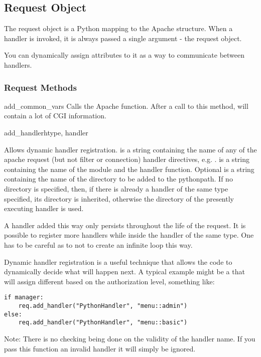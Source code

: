 \subsection{Request Object\label{pyapi-mprequest}}

The request object is a Python mapping to the Apache
 structure. When a handler is invoked, it is always
passed a single argument - the request object. 

You can dynamically assign attributes to it as a way to communicate
between handlers.

\subsubsection{Request Methods\label{pyapi-mprequest-meth}}

\begin{methoddesc}[request]{add_common_vars}{}
Calls the Apache  function. After a
call to this method,  will contain a
lot of CGI information.
\end{methoddesc}

\begin{methoddesc}[request]{add_handler}{htype, handler}

Allows dynamic handler registration.  is a string
containing the name of any of the apache request (but not filter or
connection) handler directives,
e.g. .  is a string containing the
name of the module and the handler function.  Optional  is a
string containing the name of the directory to be added to the
pythonpath. If no directory is specified, then, if there is already a
handler of the same type specified, its directory is inherited,
otherwise the directory of the presently executing handler is used.
                  
A handler added this way only persists throughout the life of the
request. It is possible to register more handlers while inside the
handler of the same type. One has to be careful as to not to create an
infinite loop this way.

Dynamic handler registration is a useful technique that allows the
code to dynamically decide what will happen next. A typical example
might be a  that will assign different
 based on the authorization level, something like:

\begin{verbatim}
if manager:
    req.add_handler("PythonHandler", "menu::admin")
else:
    req.add_handler("PythonHandler", "menu::basic")
\end{verbatim}                              

Note: There is no checking being done on the validity of the handler
name. If you pass this function an invalid handler it will simply be
ignored.
\end{methoddesc}

